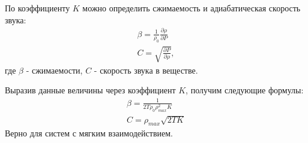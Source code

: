 \documentclass[pdf,hyperref={unicode}]{beamer}
\begin{document}
\begin{frame}
\begin{columns}
\begin{column}{0.45\linewidth}
{\tiny{
По коэффициенту $K$ можно определить сжимаемость и адиабатическая скорость звука:
\begin{equation}
\begin{aligned}
\beta = \frac{1}{\rho_0} \frac{\partial \rho}{\partial P} \\
C = \sqrt{\frac{\partial P}{\partial \rho}},
\end{aligned}
\label{eqCBeta}
\end{equation}
где $\beta$ - сжимаемости, $C$ - скорость звука в веществе.

Выразив данные величины через коэффициент $K$, получим следующие формулы:
\begin{equation}
\begin{aligned}
\beta = \frac{1}{2T\rho_0\rho_{max}^2K}\\
C = \rho_{max}\sqrt{2TK}
\end{aligned}
\label{eqCBetaK}
\end{equation}
Верно для систем с мягким взаимодействием. 
}}
\end{column}

\end{columns}
\end{frame}
\end{document}
